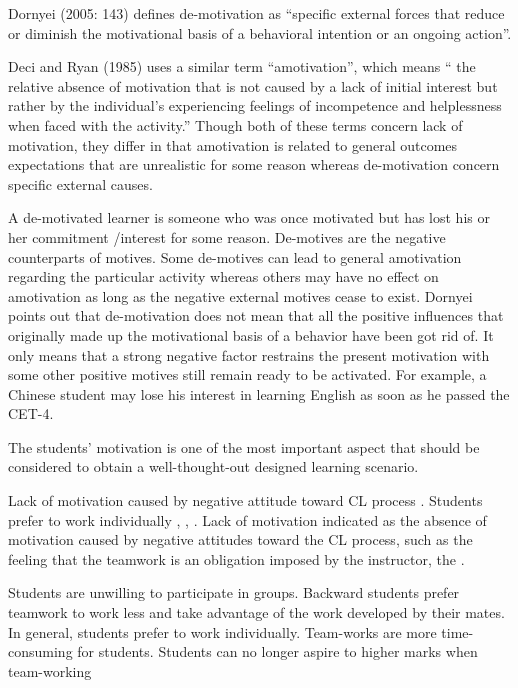 Dornyei (2005: 143) defines de-motivation as “specific external forces that reduce or diminish the motivational basis of a behavioral intention or an ongoing action”.

Deci and Ryan (1985) uses a similar term “amotivation”, which means “ the relative absence of motivation that is not caused by a lack of initial interest but rather by the individual’s experiencing feelings of incompetence and helplessness when faced with the activity.” Though both of these terms concern lack of motivation, they differ in that amotivation is related to general outcomes expectations that are unrealistic for some reason whereas de-motivation concern specific external causes. 

A de-motivated learner is someone who was once motivated but has lost his or her commitment /interest for some reason. De-motives are the negative counterparts of motives. Some de-motives can lead to general amotivation regarding the particular activity whereas others may have no effect on amotivation as long as the negative external motives cease to exist. Dornyei points out that de-motivation does not mean that all the positive influences that originally made up the motivational basis of a behavior have been got rid of. It only means that a strong negative factor restrains the present motivation with some other positive motives still remain ready to be activated. For example, a Chinese student may lose his interest in learning English as soon as he passed the CET-4.



The students' motivation is one of the most important aspect that should be considered to obtain a well-thought-out designed learning scenario.



Lack of motivation caused by negative attitude toward CL process \cite{}. Students prefer to work individually \cite{}, \cite{}, \cite{}. 
Lack of motivation indicated as the absence of motivation caused by negative attitudes toward the CL process, such as the feeling that the teamwork is an obligation imposed by the instructor, the .


Students are unwilling to participate in groups.
Backward students prefer teamwork to work less and take advantage of the work developed by their mates.
In general, students prefer to work individually.
Team-works are more time-consuming for students.
Students can no longer aspire to higher marks when team-working




